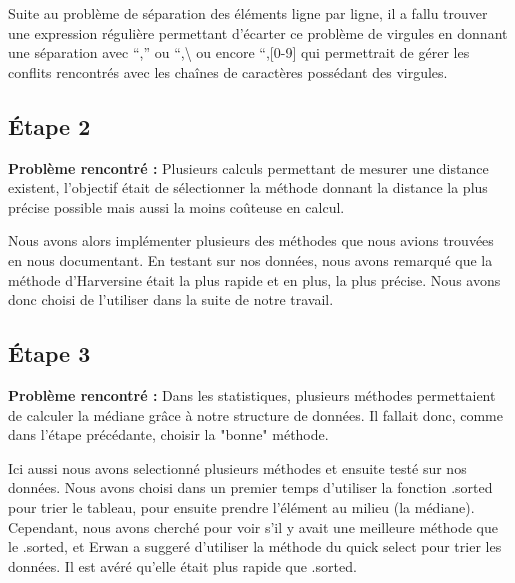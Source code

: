 \documentclass{article}
\begin{document}
\vspace{1\baselineskip}

 \newline
Suite au problème de séparation des éléments ligne par ligne, il a fallu trouver une expression régulière permettant d’écarter ce problème de virgules en donnant une séparation avec “,” ou “,\textbackslash{} ou encore “,[0-9] qui permettrait de gérer les conflits rencontrés avec les chaînes de caractères possédant des virgules.



\subsection{Étape 2} 


\textbf{Problème rencontré :} \newline
Plusieurs calculs permettant de mesurer une distance existent, l’objectif était de sélectionner la méthode donnant la distance la plus précise possible mais aussi la moins coûteuse en calcul.

\vspace{1\baselineskip}

 \newline
Nous avons alors implémenter plusieurs des méthodes que nous avions trouvées en nous documentant. En testant sur nos données, nous avons remarqué que la méthode d'Harversine était la plus rapide et en plus, la plus précise. Nous avons donc choisi de l'utiliser dans la suite de notre travail. 


\subsection{Étape 3} 


\textbf{Problème rencontré :} \newline
Dans les statistiques, plusieurs méthodes permettaient de calculer la médiane grâce à notre structure de données. Il fallait donc, comme dans l'étape précédante, choisir la "bonne" méthode.

\vspace{1\baselineskip}

 \newline
Ici aussi nous avons selectionné plusieurs méthodes et ensuite testé sur nos données. Nous avons choisi dans un premier temps d'utiliser la fonction .sorted pour trier le tableau, pour ensuite prendre l'élément au milieu (la médiane). Cependant, nous avons cherché pour voir s'il y avait une meilleure méthode que le .sorted, et Erwan a suggeré d'utiliser la méthode du quick select pour trier les données. Il est avéré qu'elle était plus rapide que .sorted.
\end{document}
